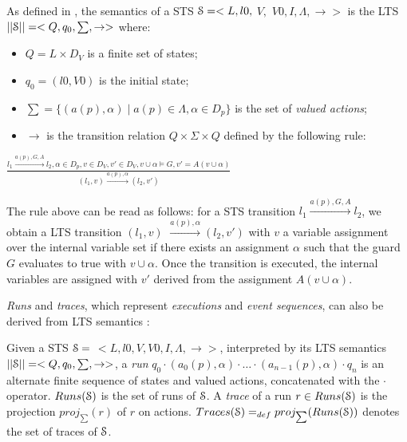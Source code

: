 \begin{definition}
    As defined in \cite{FTW05}, the semantics of a STS
    $\EuScript{S}=<L,l0,$ $V,$ $V0, I,\Lambda,\rightarrow>$ is
    the LTS $||\EuScript{S}||=<Q,q_0,\sum,\rightarrow>$ where:

	\begin{itemize}

        \item $Q=L \times D_V$ is a finite set of states;

        \item $q_0=(l0,V0)$ is the initial state;

        \item $\sum=\{(a(p),\alpha)  \mid  a(p)\in\Lambda, \alpha
            \in D_p\}$ is the set of \emph{valued actions};

        \item $\rightarrow$ is the transition relation $Q \times
            \Sigma \times Q$ defined by the following rule:\\
	\end{itemize}
    \begin{center}
    {\Large
    $\frac{l_1 \xrightarrow{a(p),G,A}l_2,\alpha \in D_p, v \in D_V, v'
        \in D_V, v \cup \alpha \models G, v'=A(v \cup \alpha)}{(l_1,v)
            \xrightarrow{a(p),\alpha} (l_2,v') }$
    }
	\end{center}

	\label{def:semantics}
\end{definition}

The rule above can be read as follows: for a STS transition $l_1
\xrightarrow{a(p),G,A}l_2$, we obtain a LTS transition $(l_1,v)$
$\xrightarrow{a(p),\alpha} (l_2,v')$ with $v$ a variable
assignment over the internal variable set if there exists an
assignment $\alpha$ such that the guard $G$ evaluates to true
with $v \cup \alpha$. Once the transition is executed, the
internal variables are assigned with $v'$ derived from the
assignment $A(v \cup \alpha)$.

\emph{Runs} and \emph{traces}, which represent \emph{executions}
and \emph{event sequences}, can also be derived from LTS
semantics \cite{jeron2006model}:

\begin{definition}
    Given a STS $\EuScript{S}=$ $<L,l0,V,V0,I,\Lambda,
    \rightarrow>$, interpreted by its LTS semantics
    $||\EuScript{S}||=<Q,q_0,\sum,\rightarrow>$, a \emph{run}
    $q_0 \cdot (a_0(p), \alpha) \cdot \dots \cdot
    (a_{n-1}(p),\alpha) \cdot q_n$
    is an alternate finite sequence of states and valued actions,
    concatenated with the $\cdot$ operator. $Runs(\EuScript{S})$
    is the set of runs of $\EuScript{S}$.
    A \emph{trace} of a run $r \in Runs(\EuScript{S})$ is the
    projection $proj_{\sum}(r)$ of $r$ on actions.
    $Traces(\EuScript{S}) =_{def} proj_{\sum}(Runs(\EuScript{S}))$
    denotes the set of traces of $\EuScript{S}$.

    \label{def:runs-and-traces}
\end{definition}

